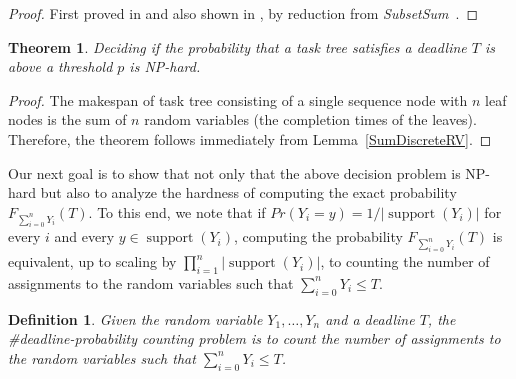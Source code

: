 \documentclass{article}
\newtheorem{theorem}{Theorem}
\newtheorem{definition}{Definition}
\DeclareMathOperator{\support}{support}
\begin{document}
\begin{proof} 
First proved in \cite{---} and also shown in \cite{cohen2015estimating}, by reduction from \textit{SubsetSum}~\cite[problem number SP13]{Garey:1990:CIG:574848}.
%
\end{proof}
 
\begin{theorem}
Deciding if the probability that a task tree satisfies a deadline $T$ is above a threshold $p$ is NP-hard.
\end{theorem}

\begin{proof} The makespan of task tree consisting of a single sequence node with $n$ leaf nodes is the sum of $n$ random variables (the completion times of the leaves). Therefore, the theorem follows immediately from Lemma~\ref{SumDiscreteRV}. 
\end{proof}

Our next goal is to show that not only that the above decision problem is NP-hard but also to analyze the hardness of computing the exact probability $F_{\sum_{i=0}^{n} Y_{i}}(T)$. To this end, we note that 
if $Pr(Y_i=y)=1/|\support(Y_i)|$ for every $i$ and every $y\in\support(Y_i)$, computing the probability $F_{\sum_{i=0}^{n} Y_{i}}(T)$ is equivalent, up to scaling by $\prod_{i=1}^n |\support(Y_i)|$, to counting the number of assignments to the random variables  such that $\sum_{i=0}^{n} Y_{i} \leq T$. 

\begin{definition} 
	Given the random variable $Y_1,\dots,Y_n$ and a deadline $T$,
	the \#deadline-probability counting problem is to count the number of assignments to the random variables such that $\sum_{i=0}^{n} Y_{i} \leq T$.
\end{definition}
\end{document}
